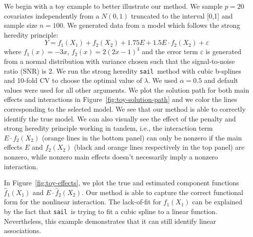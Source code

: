 \documentclass[12pt,letter]{article}\usepackage[]{graphicx}\usepackage[]{color}
\newcommand{\sail}{\texttt{sail }}
\begin{document}
We begin with a toy example to better illustrate our method. We sample $p=20$ covariates independently from a $N(0,1)$ truncated to the interval [0,1] and sample size $n=100$. We generated data from a model which follows the strong heredity principle:
\begin{equation}
	Y = f_1(X_1) + f_2(X_2) + 1.75 E + 1.5 E \cdot f_2(X_2) + \varepsilon
\end{equation}
where $f_1(x) = -3x$, $f_2(x) = 2(2x-1)^3$ and the error term $\varepsilon$ is generated from a normal distribution with variance chosen such that the signal-to-noise ratio (SNR) is 2. We run the strong heredity \sail method with cubic b-splines and 10-fold CV to choose the optimal value of $\lambda$. We used $\alpha=0.5$ and default values were used for all other arguments. We plot the solution path for both main effects and interactions in Figure~\ref{fig:toy-solution-path} and we color the lines corresponding to the selected model. We see that our method is able to correctly identify the true model. We can also visually see the effect of the penalty and strong heredity principle working in tandem, i.e., the interaction term $E \cdot f_2(X_2)$ (orange lines in the bottom panel) can only be nonzero if the main effects $E$ and $f_2(X_2)$ (black and orange lines respectively in the top panel) are nonzero, while nonzero main effects doesn't necessarily imply a nonzero interaction. 





In Figure~\ref{fig:toy-effects}, we plot the true and estimated component functions $\hat{f}_1(X_1)$ and $E \cdot \hat{f}_2(X_2)$. Our method is able to capture the correct functional form for the nonlinear interaction. The lack-of-fit for $f_1(X_1)$ can be explained by the fact that \sail is trying to fit a cubic spline to a linear function. Nevertheless, this example demonstrates that it can still identify linear associations. 
\end{document}
